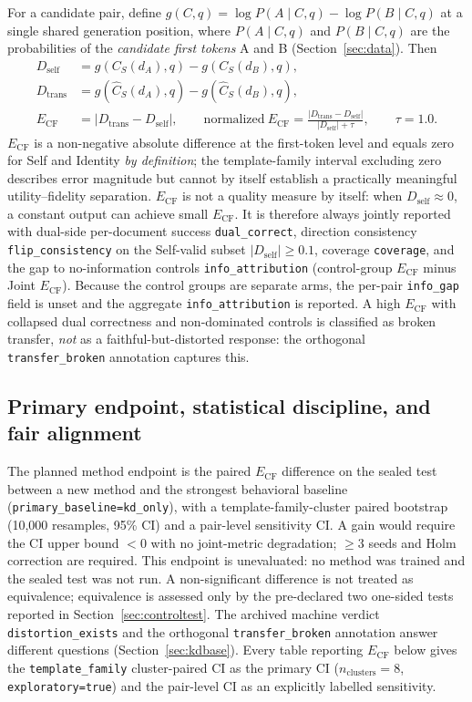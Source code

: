 \documentclass[11pt,twocolumn]{article}
\begin{document}
For a candidate pair, define $g(C,q)=\log P(A\mid C,q)-\log P(B\mid C,q)$ at a
single shared generation position, where $P(A\mid C,q)$ and $P(B\mid C,q)$ are
the probabilities of the \emph{candidate first tokens} A and B
(Section~\ref{sec:data}). Then
\begin{align}
D_{\mathrm{self}} &= g(C_S(d_A),q)-g(C_S(d_B),q),\\
D_{\mathrm{trans}} &= g(\hat C_S(d_A),q)-g(\hat C_S(d_B),q),\\
E_{\mathrm{CF}} &= |D_{\mathrm{trans}}-D_{\mathrm{self}}|,\qquad
\mathrm{normalized}\ E_{\mathrm{CF}}=\frac{|D_{\mathrm{trans}}-D_{\mathrm{self}}|}
{|D_{\mathrm{self}}|+\tau},\qquad \tau=1.0 .
\end{align}
$E_{\mathrm{CF}}$ is a non-negative absolute difference at the first-token
level and equals zero for Self and Identity \emph{by definition}; the
template-family interval excluding zero describes error magnitude but cannot
by itself establish a practically meaningful utility--fidelity separation.
$E_{\mathrm{CF}}$ is not a quality measure by itself: when
$D_{\mathrm{self}}\approx0$, a constant output can achieve small
$E_{\mathrm{CF}}$. It is therefore always jointly reported with dual-side
per-document success \texttt{dual\_correct}, direction consistency
\texttt{flip\_consistency} on the Self-valid subset $|D_{\mathrm{self}}|\ge0.1$,
coverage \texttt{coverage}, and the gap to no-information controls
\texttt{info\_attribution} (control-group $E_{\mathrm{CF}}$ minus Joint
$E_{\mathrm{CF}}$). Because the control groups are separate arms, the per-pair
\texttt{info\_gap} field is unset and the aggregate \texttt{info\_attribution}
is reported. A high $E_{\mathrm{CF}}$ with collapsed dual correctness and
non-dominated controls is classified as broken transfer, \emph{not} as a
faithful-but-distorted response: the orthogonal \texttt{transfer\_broken}
annotation captures this.

\subsection{Primary endpoint, statistical discipline, and fair alignment}
\label{sec:stats}

The planned method endpoint is the paired $E_{\mathrm{CF}}$ difference on the
sealed test between a new method and the strongest behavioral baseline
(\texttt{primary\_baseline=kd\_only}), with a template-family-cluster paired
bootstrap (10{,}000 resamples, 95\% CI) and a pair-level sensitivity CI. A gain
would require the CI upper bound $<0$ with no joint-metric degradation;
$\geq3$ seeds and Holm correction are required. This endpoint is unevaluated:
no method was trained and the sealed test was not run. A non-significant
difference is not treated as equivalence; equivalence is assessed only by the
pre-declared two one-sided tests reported in Section~\ref{sec:controltest}. The
archived machine verdict \texttt{distortion\_exists} and the orthogonal
\texttt{transfer\_broken} annotation answer different questions
(Section~\ref{sec:kdbase}). Every table reporting $E_{\mathrm{CF}}$ below gives
the \texttt{template\_family} cluster-paired CI as the primary CI
($n_{\mathrm{clusters}}=8$, \texttt{exploratory=true}) and the pair-level CI as
an explicitly labelled sensitivity.
\end{document}
